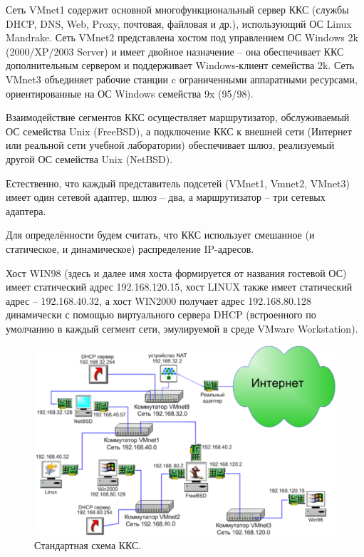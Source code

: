 \documentclass[a4paper, 12pt]{article}		%
\begin{document}
Сеть VMnet1 содержит основной многофункциональный сервер ККС (службы DHCP, DNS, Web, Proxy, почтовая, файловая и др.), использующий ОС Linux Mandrake. Сеть VMnet2 представлена хостом под управлением ОС Windows 2k (2000/XP/2003 Server) и имеет двойное назначение – она обеспечивает ККС дополнительным сервером и поддерживает Windows-клиент семейства 2k. Сеть VMnet3 объединяет рабочие станции c ограниченными аппаратными ресурсами, ориентированные на ОС Windows семейства 9x (95/98).

Взаимодействие сегментов ККС осуществляет маршрутизатор, обслуживаемый ОС семейства Unix (FreeBSD), а подключение ККС к внешней сети (Интернет или реальной сети учебной лаборатории) обеспечивает шлюз, реализуемый другой ОС семейства Unix (NetBSD).

Естественно, что каждый представитель подсетей (VMnet1, Vmnet2, VMnet3) имеет один сетевой адаптер, шлюз – два, а маршрутизатор – три сетевых адаптера.

Для определённости будем считать, что ККС использует смешанное (и статическое, и динамическое) распределение IP-адресов. 

Хост WIN98 (здесь и далее имя хоста формируется от названия гостевой ОС) имеет статический адрес 192.168.120.15, хост LINUX также имеет статический адрес – 192.168.40.32, а хост WIN2000 получает адрес 192.168.80.128 динамически с помощью виртуального сервера DHCP (встроенного по умолчанию в каждый сегмент сети, эмулируемой в среде VMware Workstation).

\begin{figure}[h!]
\centering
\includegraphics[scale=1]{res/network_general2}
\caption{Стандартная схема ККС.}
\end{figure}
\end{document}
